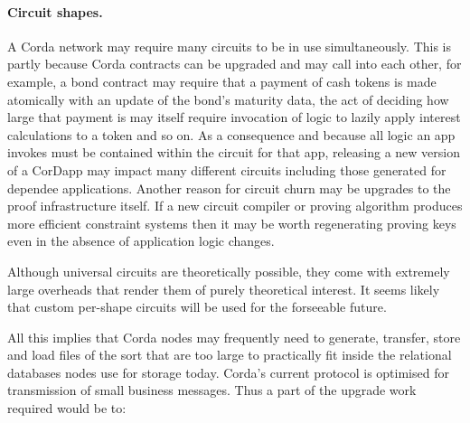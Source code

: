\documentclass{article}
\begin{document}
\paragraph{Circuit shapes.}A Corda network may require many circuits to be in use simultaneously. This is partly
because Corda contracts can be upgraded and may call into each other, for example, a bond contract may require that
a payment of cash tokens is made atomically with an update of the bond's maturity data, the act of deciding how
large that payment is may itself require invocation of logic to lazily apply interest calculations to a token and
so on. As a consequence and because all logic an app invokes must be contained within the circuit for that app,
releasing a new version of a CorDapp may impact many different circuits including those generated for dependee
applications. Another reason for circuit churn may be upgrades to the proof infrastructure itself. If a new circuit
compiler or proving algorithm produces more efficient constraint systems then it may be worth regenerating proving
keys even in the absence of application logic changes.

Although universal circuits are theoretically possible, they come with extremely large overheads that render them
of purely theoretical interest. It seems likely that custom per-shape circuits will be used for the forseeable future.

All this implies that Corda nodes may frequently need to generate, transfer, store and load files of the sort that
are too large to practically fit inside the relational databases nodes use for storage today. Corda's current
protocol is optimised for transmission of small business messages. Thus a part of the upgrade work required
would be to:
\end{document}
